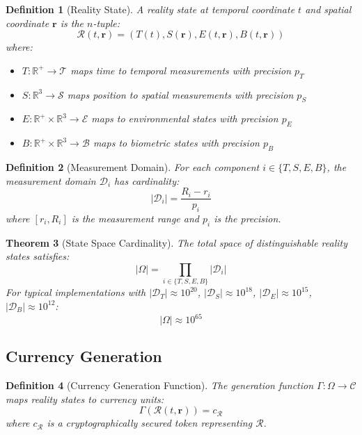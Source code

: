 \documentclass[12pt]{article}
\newtheorem{theorem}{Theorem}
\newtheorem{definition}[theorem]{Definition}
\begin{document}
\begin{definition}[Reality State]
A reality state at temporal coordinate $t$ and spatial coordinate $\mathbf{r}$ is the $n$-tuple:
$$
\mathcal{R}(t, \mathbf{r}) = (T(t), S(\mathbf{r}), E(t,\mathbf{r}), B(t,\mathbf{r}))
$$
where:
\begin{itemize}
    \item $T: \mathbb{R}^+ \to \mathcal{T}$ maps time to temporal measurements with precision $p_T$
    \item $S: \mathbb{R}^3 \to \mathcal{S}$ maps position to spatial measurements with precision $p_S$
    \item $E: \mathbb{R}^+ \times \mathbb{R}^3 \to \mathcal{E}$ maps to environmental states with precision $p_E$
    \item $B: \mathbb{R}^+ \times \mathbb{R}^3 \to \mathcal{B}$ maps to biometric states with precision $p_B$
\end{itemize}
\end{definition}

\begin{definition}[Measurement Domain]
For each component $i \in \{T, S, E, B\}$, the measurement domain $\mathcal{D}_i$ has cardinality:
$$
|\mathcal{D}_i| = \frac{R_i - r_i}{p_i}
$$
where $[r_i, R_i]$ is the measurement range and $p_i$ is the precision.
\end{definition}

\begin{theorem}[State Space Cardinality]
The total space of distinguishable reality states satisfies:
$$
|\Omega| = \prod_{i \in \{T,S,E,B\}} |\mathcal{D}_i|
$$
For typical implementations with $|\mathcal{D}_T| \approx 10^{20}$, $|\mathcal{D}_S| \approx 10^{18}$, $|\mathcal{D}_E| \approx 10^{15}$, $|\mathcal{D}_B| \approx 10^{12}$:
$$
|\Omega| \approx 10^{65}
$$
\end{theorem}

\subsection{Currency Generation}

\begin{definition}[Currency Generation Function]
The generation function $\Gamma: \Omega \to \mathcal{C}$ maps reality states to currency units:
$$
\Gamma(\mathcal{R}(t,\mathbf{r})) = c_{\mathcal{R}}
$$
where $c_{\mathcal{R}}$ is a cryptographically secured token representing $\mathcal{R}$.
\end{definition}
\end{document}
